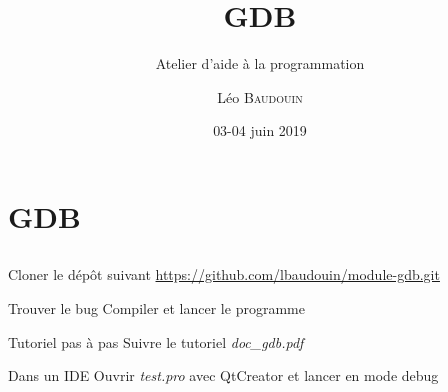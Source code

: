 \documentclass{beamer}
\title{GDB}
\subtitle{Atelier d'aide à la programmation}
\author{L\'eo \textsc{Baudouin}}
\institute{
  {\url{baudouin.leo @ gmail.com}}
}
\date{03-04 juin 2019}
\begin{document}
\begin{frame}
  \titlepage
\end{frame}

\section{GDB}
\subsection{}

\begin{frame}{}

\begin{block}{Cloner le dép\^ot suivant}
\url{https://github.com/lbaudouin/module-gdb.git}
\end{block}

\begin{block}{Trouver le bug}
Compiler et lancer le programme
\end{block}

\begin{block}{Tutoriel pas à pas}
Suivre le tutoriel \emph{doc\_gdb.pdf}\footnotemark
\end{block}

\begin{block}{Dans un IDE}
Ouvrir \emph{test.pro} avec QtCreator et lancer en mode debug
\end{block}


\end{frame}


\end{document}
